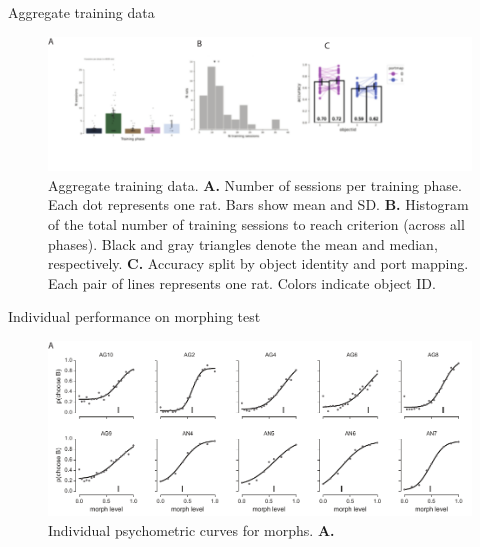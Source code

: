 Aggregate training data
\begin{figure}[t!]
\includegraphics[width=\textwidth]{figures/supplemental/fig_s1_aggregate_training/fig_s1_aggregate_training.pdf}
    \vspace{.1in}
    \caption[Aggregate training data]{Aggregate training data. 
    \textbf{A.} Number of sessions per training phase. Each dot represents one rat. Bars show mean and SD.
    \textbf{B.} Histogram of the total number of training sessions to reach criterion (across all phases). Black and gray triangles denote the mean and median, respectively. 
    \textbf{C.} Accuracy split by object identity and port mapping. Each pair of lines represents one rat. Colors indicate object ID. 
    \label{supfig:aggregate_training}}
\end{figure}

Individual performance on morphing test
\begin{figure}[t!]
\includegraphics[width=\textwidth]{figures/supplemental/fig_s2_morphs_per_animal/fig_s2_morphs_per_animal.pdf}
    \vspace{.1in}
    \caption[Individual psychometric curves]{Individual psychometric curves for morphs. 
    \textbf{A.} 
    \label{supfig:morphs}}
\end{figure}

